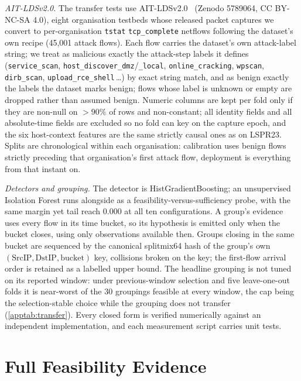 \documentclass[conference]{IEEEtran}
\begin{document}
\emph{AIT-LDSv2.0.} The transfer tests use AIT-LDSv2.0~\cite{aitlds} (Zenodo 5789064, CC BY-NC-SA 4.0), eight
organisation testbeds whose released packet captures we convert to per-organisation \texttt{tstat}
\texttt{tcp\_complete} netflows following the dataset's own recipe (45,001 attack flows). Each flow
carries the dataset's own attack-label string; we treat as malicious exactly the attack-step labels it
defines (\texttt{service\_scan}, \texttt{host\_discover\_dmz}/\texttt{\_local},
\texttt{online\_cracking}, \texttt{wpscan}, \texttt{dirb\_scan}, \texttt{upload\_rce\_shell}\,\ldots) by
exact string match, and as benign exactly the labels the dataset marks benign; flows whose label is
unknown or empty are dropped rather than assumed benign. Numeric columns are kept per fold only if they
are non-null on $>\!90\%$ of rows and non-constant; all identity fields and all absolute-time fields are
excluded so no fold can key on the capture epoch, and the six host-context features are the same strictly
causal ones as on LSPR23. Splits are chronological within each organisation: calibration uses benign
flows strictly preceding that organisation's first attack flow, deployment is everything from that
instant on.

\emph{Detectors and grouping.} The detector is HistGradientBoosting; an unsupervised Isolation Forest runs
alongside as a feasibility-versus-sufficiency probe, with the same margin yet tail reach $0.000$ at all
ten configurations. A group's evidence uses every flow in its time bucket, so its hypothesis is emitted
only when the bucket closes, using only observations available then. Groups closing in the same bucket
are sequenced by the canonical splitmix64 hash of the group's own $(\mathrm{SrcIP},\mathrm{DstIP},
\text{bucket})$ key, collisions broken on the key; the first-flow arrival order is retained as a labelled
upper bound. The headline grouping is not tuned on its reported window: under previous-window selection
and five leave-one-out folds it is near-worst of the 30 groupings feasible at every window, the cap
being the selection-stable choice while the grouping does not transfer (\cref{apptab:transfer}). Every
closed form is verified numerically against an independent implementation, and each measurement script
carries unit tests.

\section{Full Feasibility Evidence}\label{app:feasibility}\label{app:matrices}\label{app:boundary}
\end{document}
